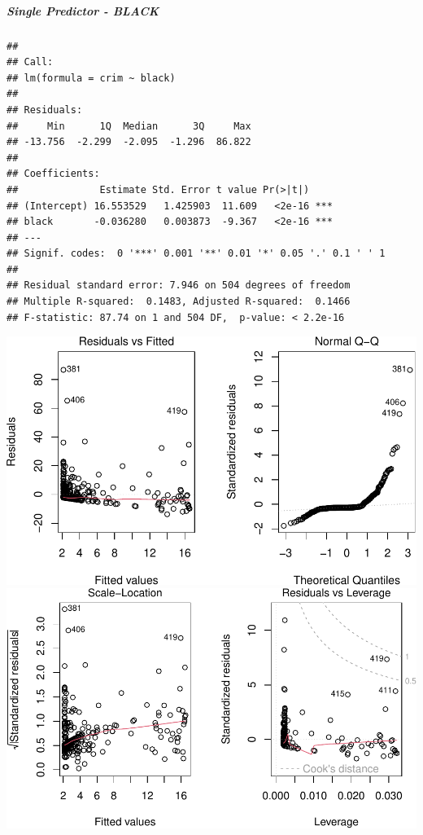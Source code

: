 \documentclass[
]{article}
\begin{document}
\hypertarget{single-predictor---black}{%
\subparagraph{\texorpdfstring{\textbf{Single Predictor -
BLACK}}{Single Predictor - BLACK}}\label{single-predictor---black}}

\begin{verbatim}
## 
## Call:
## lm(formula = crim ~ black)
## 
## Residuals:
##     Min      1Q  Median      3Q     Max 
## -13.756  -2.299  -2.095  -1.296  86.822 
## 
## Coefficients:
##              Estimate Std. Error t value Pr(>|t|)    
## (Intercept) 16.553529   1.425903  11.609   <2e-16 ***
## black       -0.036280   0.003873  -9.367   <2e-16 ***
## ---
## Signif. codes:  0 '***' 0.001 '**' 0.01 '*' 0.05 '.' 0.1 ' ' 1
## 
## Residual standard error: 7.946 on 504 degrees of freedom
## Multiple R-squared:  0.1483, Adjusted R-squared:  0.1466 
## F-statistic: 87.74 on 1 and 504 DF,  p-value: < 2.2e-16
\end{verbatim}

\includegraphics{Disha_Gandhi_Take_Home_Exam_PDF_files/figure-latex/unnamed-chunk-28-1.pdf}
\includegraphics{Disha_Gandhi_Take_Home_Exam_PDF_files/figure-latex/unnamed-chunk-28-2.pdf}
\end{document}
